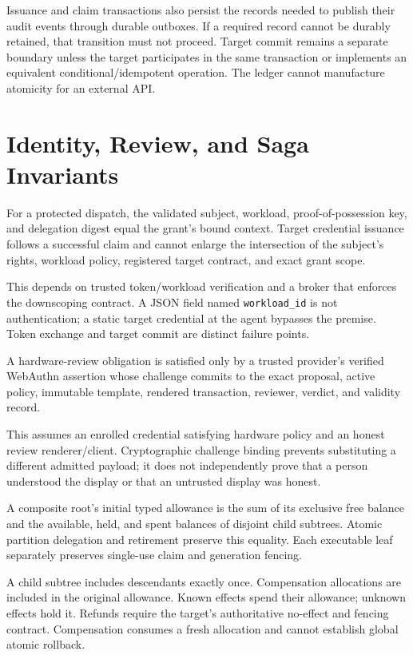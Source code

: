 \normalsize

Issuance and claim transactions also persist the records needed to publish their audit events through durable outboxes. If a required record cannot be durably retained, that transition must not proceed. Target commit remains a separate boundary unless the target participates in the same transaction or implements an equivalent conditional/idempotent operation. The ledger cannot manufacture atomicity for an external API.


\section{Identity, Review, and Saga Invariants}
\label{sec:app-extended}
\begin{proposition}
For a protected dispatch, the validated subject, workload, proof-of-possession key, and delegation digest equal the grant's bound context. Target credential issuance follows a successful claim and cannot enlarge the intersection of the subject's rights, workload policy, registered target contract, and exact grant scope.
\end{proposition}
This depends on trusted token/workload verification and a broker that enforces the downscoping contract. A JSON field named \texttt{workload\_id} is not authentication; a static target credential at the agent bypasses the premise. Token exchange and target commit are distinct failure points.

\begin{proposition}
A hardware-review obligation is satisfied only by a trusted provider's verified WebAuthn assertion whose challenge commits to the exact proposal, active policy, immutable template, rendered transaction, reviewer, verdict, and validity record.
\end{proposition}
This assumes an enrolled credential satisfying hardware policy and an honest review renderer/client. Cryptographic challenge binding prevents substituting a different admitted payload; it does not independently prove that a person understood the display or that an untrusted display was honest.

\begin{proposition}
A composite root's initial typed allowance is the sum of its exclusive free balance and the available, held, and spent balances of disjoint child subtrees. Atomic partition delegation and retirement preserve this equality. Each executable leaf separately preserves single-use claim and generation fencing.
\end{proposition}
A child subtree includes descendants exactly once. Compensation allocations are included in the original allowance. Known effects spend their allowance; unknown effects hold it. Refunds require the target's authoritative no-effect and fencing contract. Compensation consumes a fresh allocation and cannot establish global atomic rollback.


